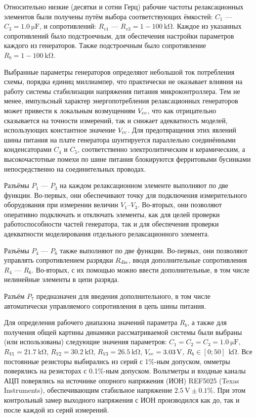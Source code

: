 Относительно низкие (десятки и сотни Герц) рабочие частоты
релаксационных элементов были получены путём выбора соответствующих
ёмкостей:
$C_1$ --- $C_3 = \SI{1.0}{\micro\farad}$,
и сопротивлений:
$R_{v1}$ --- $R_{v3} = 1-\SI{100}{\kilo\ohm}$.
Каждое из указанных сопротивлений было подстроечным, для обеспечения
настройки параметров каждого из генераторов. Также подстроечным было сопротивление
$ R_{b} = 1-\SI{100}{\kilo\ohm}$.

Выбранные параметры генераторов определяют небольшой ток
потребления схемы, порядка единиц миллиампер, что
практически не оказывает влияния на работу
системы стабилизации напряжения питания микроконтроллера.
Тем не менее, импульсный характер энергопотребления
релаксационных генераторов может привести
к локальным возмущениям $V_\mathrm{cc}$, что
как отрицательно сказывается на точности измерений,
так и снижает адекватность моделей, использующих
константное значение $V_\mathrm{cc}$.
Для предотвращения этих явлений шины питания на плате генератора
шунтируется параллельно соединёнными конденсаторами $C_4$ и $C_5$,
соответственно электролитическим и керамическим,
а высокочастотные помехи по шине питания блокируются
ферритовыми бусинками непосредственно на соединительных проводах.

Разъёмы $P_1$ --- $P_3$ на каждом  релаксационном элементе
выполняют по две функции.
Во-первых, они обеспечивают точку для подключения измерительного
оборудования при измерении величин $V_1$--$V_3$.
Во-вторых, они позволяют оперативно
подключать и отключать элементы, как для целей
проверки работоспособности частей генератора,
так и для обеспечения проверки адекватности моделирования
отдельного релаксационного элемента.


Разъёмы $P_4$ --- $P_6$
также выполняют по две функции.
Во-первых, они позволяют управлять сопротивлением
разрядки $R_\mathrm{dis}$, вводя дополнительные сопротивления
$R_4$ --- $R_6$.
Во-вторых, с их помощью можно ввести дополнительные,
в том числе нелинейные элементы в цепи разряда.

Разъём $P_7$
предназначен для введения дополнительного,
в том числе автоматически управляемого сопротивления
в цепь шины питания.

Для определения рабочего диапазона значений параметра $R_b$,
а также для получения общей картины динамики рассматриваемой системы
были выбраны (или использованы) следующие значения параметров:
$C_1 = C_2 = C_3 = \SI{1.0}{\micro\farad}$,
$R_{V1} = \SI{21.7}{\kilo\ohm}$,
$R_{V2} = \SI{30.2}{\kilo\ohm}$,
$R_{V3} = \SI{26.5}{\kilo\ohm}$,
$V_\mathrm{cc} = \SI{3.03}{\volt}$,
$R_{b} \in [0;50]~ \SI{}{\kilo\ohm}$.
Все постоянные резисторы выбирались из серий с 1\%-ным допуском,
омметры поверялись на резисторах с 0.1\%-ным допуском.
Вольтметры и входные каналы АЦП
поверялись на источнике опорного напряжения (ИОН)
REF5025 (Texas Instruments), обеспечивающим
стабильное напряжение $\SI{2.5}{\volt} \pm 0.1 \%$.
При этом контрольный замер выходного напряжения с ИОН
производился как до, так и после каждой из серий измерений.

